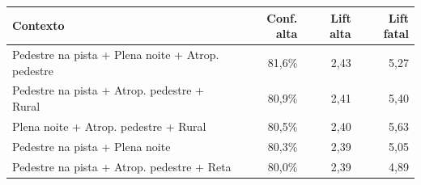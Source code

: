\begin{tabular}{@{}p{8.7cm}rrr@{}}
\toprule
\textbf{Contexto} & \textbf{Conf. alta} & \textbf{Lift alta} & \textbf{Lift fatal} \\
\midrule
Pedestre na pista + Plena noite + Atrop. pedestre & 81,6\% & 2,43 & 5,27 \\
Pedestre na pista + Atrop. pedestre + Rural & 80,9\% & 2,41 & 5,40 \\
Plena noite + Atrop. pedestre + Rural & 80,5\% & 2,40 & 5,63 \\
Pedestre na pista + Plena noite & 80,3\% & 2,39 & 5,05 \\
Pedestre na pista + Atrop. pedestre + Reta & 80,0\% & 2,39 & 4,89 \\
\bottomrule
\end{tabular}